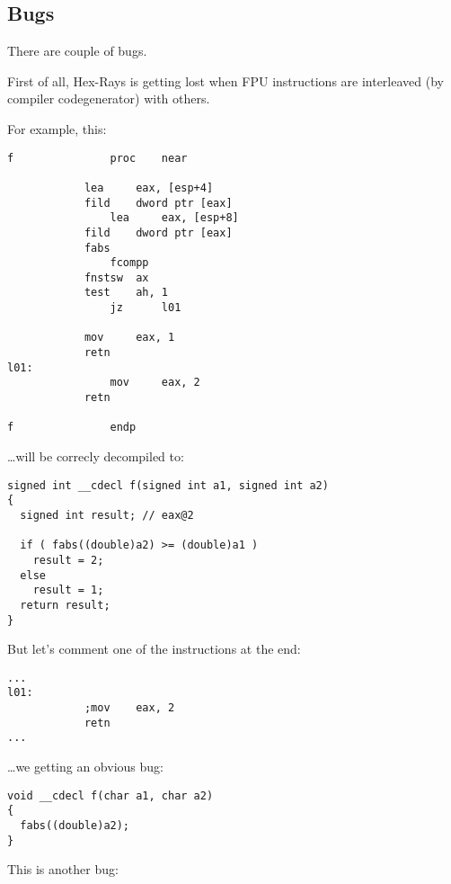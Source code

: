 \label{hex_rays}

\subsection{Bugs}

There are couple of bugs.

First of all, Hex-Rays is getting lost when \ac{FPU} instructions are interleaved (by compiler codegenerator) with others.

For example, this:

\begin{lstlisting}[style=customasmx86]
f               proc    near

        	lea     eax, [esp+4]
	        fild    dword ptr [eax]
                lea     eax, [esp+8]
        	fild    dword ptr [eax]
	        fabs
                fcompp
        	fnstsw  ax
	        test    ah, 1
                jz      l01

        	mov     eax, 1
	        retn
l01:
                mov     eax, 2
	        retn

f               endp
\end{lstlisting}

\dots will be correcly decompiled to:

\begin{lstlisting}[style=customc]
signed int __cdecl f(signed int a1, signed int a2)
{
  signed int result; // eax@2

  if ( fabs((double)a2) >= (double)a1 )
    result = 2;
  else
    result = 1;
  return result;
}
\end{lstlisting}

But let's comment one of the instructions at the end:

\begin{lstlisting}[style=customasmx86]
...
l01:
	        ;mov    eax, 2
        	retn
...
\end{lstlisting}

\dots we getting an obvious bug:

\begin{lstlisting}[style=customc]
void __cdecl f(char a1, char a2)
{
  fabs((double)a2);
}
\end{lstlisting}

This is another bug:

